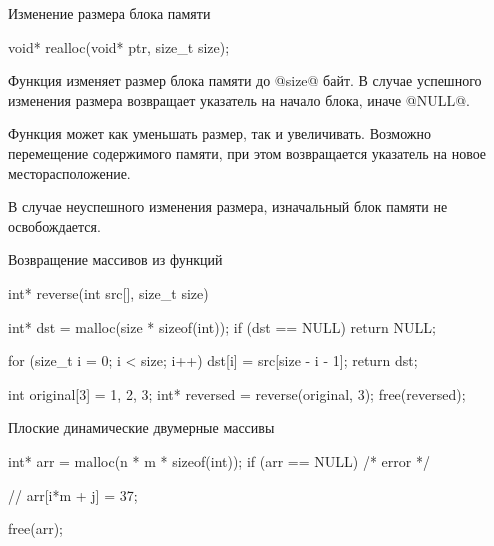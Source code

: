 \begin{frame}[fragile]{Изменение размера блока памяти}

  \begin{clisting}[basicstyle=\ttfamily]
    void* realloc(void* ptr, size_t size);
  \end{clisting}

  Функция изменяет размер блока памяти до @size@ байт. В случае успешного
  изменения размера возвращает указатель на начало блока, иначе @NULL@.

  \pause
  Функция может как уменьшать размер, так и увеличивать. Возможно перемещение
  содержимого памяти, при этом возвращается указатель на новое
  месторасположение.

  \pause
  В случае неуспешного изменения размера, изначальный блок памяти не
  освобождается.


\end{frame}

\begin{frame}[fragile]{Возвращение массивов из функций}

  \begin{clisting}
    int* reverse(int src[], size_t size) {
        int* dst = malloc(size * sizeof(int));
        if (dst == NULL) { return NULL; }

        for (size_t i = 0; i < size; i++) {
            dst[i] = src[size - i - 1];
        }
        return dst;
    }
    int original[3] = {1, 2, 3};
    int* reversed = reverse(original, 3);
    free(reversed);
  \end{clisting}


\end{frame}

\begin{frame}[fragile]{Плоские динамические двумерные массивы}

  \begin{clisting}
    int* arr = malloc(n * m * sizeof(int));
    if (arr == NULL) { /* error */ }

    // arr[i*m + j] = 37;

    free(arr);
  \end{clisting}


\end{frame}

